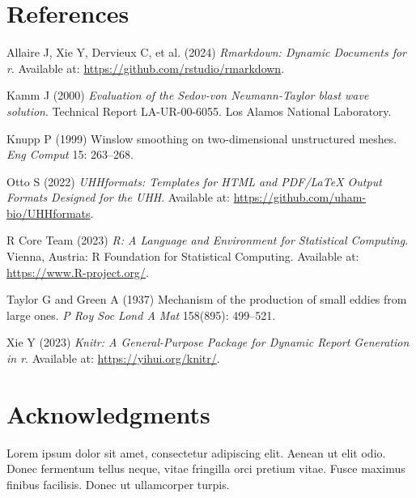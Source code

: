 \documentclass[
  letterpaper,
  DIV=11,
  numbers=noendperiod]{scrartcl}
\newlength{\cslhangindent}
\newenvironment{CSLReferences}[2] %
 {\begin{list}{}{%
  \setlength{\itemindent}{0pt}
  \setlength{\leftmargin}{0pt}
  \setlength{\parsep}{0pt}
  \ifodd #1
   \setlength{\leftmargin}{\cslhangindent}
   \setlength{\itemindent}{-1\cslhangindent}
  \fi
  \setlength{\itemsep}{#2\baselineskip}}}
 {\end{list}}
\begin{document}
\newpage

\section{References}\label{references}

\label{refs}
\begin{CSLReferences}{1}{1}
Allaire J, Xie Y, Dervieux C, et al. (2024) \emph{Rmarkdown: Dynamic
Documents for r}. Available at:
\url{https://github.com/rstudio/rmarkdown}.

Kamm J (2000) \emph{Evaluation of the {S}edov-von {N}eumann-{T}aylor
blast wave solution}. Technical {R}eport LA-UR-00-6055. Los {A}lamos
{N}ational {L}aboratory.

Knupp P (1999) Winslow smoothing on two-dimensional unstructured meshes.
\emph{Eng {C}omput} 15: 263--268.

Otto S (2022) \emph{UHHformats: Templates for HTML and PDF/LaTeX Output
Formats Designed for the UHH}. Available at:
\url{https://github.com/uham-bio/UHHformats}.

R Core Team (2023) \emph{R: A Language and Environment for Statistical
Computing}. Vienna, Austria: R Foundation for Statistical Computing.
Available at: \url{https://www.R-project.org/}.

Taylor G and Green A (1937) Mechanism of the production of small eddies
from large ones. \emph{P {R}oy {S}oc {L}ond {A} {M}at} 158(895):
499--521.

Xie Y (2023) \emph{Knitr: A General-Purpose Package for Dynamic Report
Generation in r}. Available at: \url{https://yihui.org/knitr/}.

\end{CSLReferences}

\section*{Acknowledgments}\label{acknowledgments}

Lorem ipsum dolor sit amet, consectetur adipiscing elit. Aenean ut elit
odio. Donec fermentum tellus neque, vitae fringilla orci pretium vitae.
Fusce maximus finibus facilisis. Donec ut ullamcorper turpis.
\end{document}
